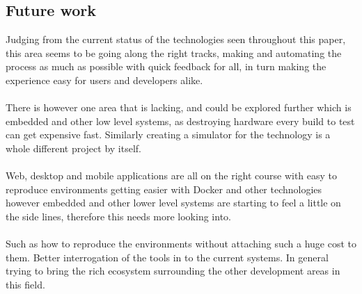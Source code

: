\subsection{Future work}

Judging from the current status of the technologies seen throughout this paper, this area seems to be going along the right tracks, making and automating the process as much as possible with quick feedback for all, in turn making the experience easy for users and developers alike.
\\\\
There is however one area that is lacking, and could be explored further which is embedded and other low level systems, as destroying hardware every build to test can get expensive fast. Similarly creating a simulator for the technology is a whole different project by itself. 
\\\\
Web, desktop and mobile applications are all on the right course with easy to reproduce environments getting easier with Docker and other technologies however embedded and other lower level systems are starting to feel a little on the side lines, therefore this needs more looking into. 
\\\\
Such as how to reproduce the environments without attaching such a huge cost to them. Better interrogation of the tools in to the current systems. In general trying to bring the rich ecosystem surrounding the other development areas in this field.